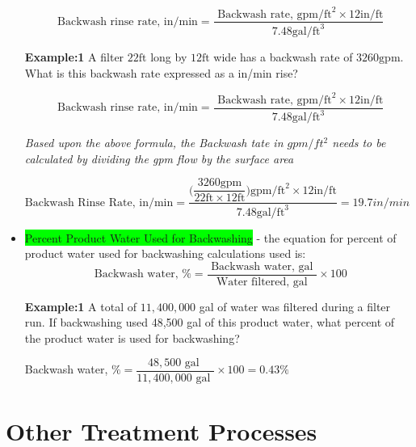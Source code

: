 \begin{itemize}
$$\text{ Backwash rinse rate, in/} \mathrm{min}=\frac{\text { Backwash rate, } \mathrm{gpm} / \mathrm{ft}^{2} \times 12 \mathrm{in} / \mathrm{ft}}{7.48 \mathrm{gal} / \mathrm{ft}^{3}}$$

\textbf{Example:1}
A filter $22 \mathrm{ft}$ long by $12 \mathrm{ft}$ wide has a backwash rate of $3260 \mathrm{gpm}$. What is this backwash rate expressed as a in/min rise?

$$\text{ Backwash rinse rate, in/} \mathrm{min}=\frac{\text { Backwash rate, } \mathrm{gpm} / \mathrm{ft}^{2} \times 12 \mathrm{in} / \mathrm{ft}}{7.48 \mathrm{gal} / \mathrm{ft}^{3}}$$

\textit{Based upon the above formula, the Backwash tate in $gpm/ft^2$ needs to be calculated by dividing the gpm flow by the surface area}

$\text{Backwash Rinse Rate, in/} \mathrm{min}=\dfrac{
\Biggl(\dfrac{3260 \mathrm{gpm}}{22 \mathrm{ft} \times 12 \mathrm{ft}}\Biggr) \mathrm{gpm} / \mathrm{ft}^{2} \times 12 \mathrm{in} / \mathrm{ft}
}
{
7.48 \mathrm{gal} / \mathrm{ft}^{3}
}=\boxed{19.7in/min}$


\item \colorbox{lime}{Percent Product Water Used for Backwashing} - the equation for percent of product water used for backwashing calculations used is:\\
$$
\text { Backwash water, } \%=\frac{\text { Backwash water, gal }}{\text { Water filtered, gal }} \times 100
$$

\textbf{Example:1}
A total of $11,400,000$ gal of water was filtered during a filter run. If backwashing used 48,500 gal of this product water, what percent of the product water is used for backwashing?

Backwash water, $\%=\dfrac{48,500 \text { gal }}{11,400,000 \text { gal }} \times 100 = \boxed{0.43 \%}$

\end{itemize}

\section{Other Treatment Processes}

